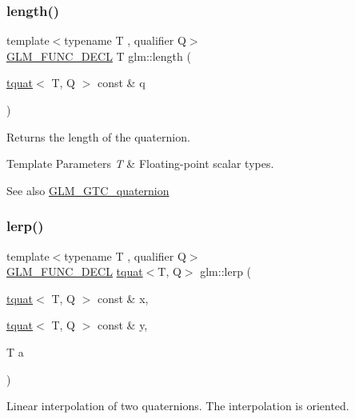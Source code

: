 \subsubsection{\texorpdfstring{length()}{length()}}
{\footnotesize\ttfamily template$<$typename T , qualifier Q$>$ \\
\mbox{\hyperlink{setup_8hpp_ab2d052de21a70539923e9bcbf6e83a51}{G\+L\+M\+\_\+\+F\+U\+N\+C\+\_\+\+D\+E\+CL}} T glm\+::length (\begin{DoxyParamCaption}\item[{\mbox{\hyperlink{structglm_1_1tquat}{tquat}}$<$ T, Q $>$ const \&}]{q }\end{DoxyParamCaption})}

Returns the length of the quaternion.


\begin{DoxyTemplParams}{Template Parameters}
{\em T} & Floating-\/point scalar types.\\
\hline
\end{DoxyTemplParams}
\begin{DoxySeeAlso}{See also}
\mbox{\hyperlink{group__gtc__quaternion}{G\+L\+M\+\_\+\+G\+T\+C\+\_\+quaternion}} 
\end{DoxySeeAlso}
\mbox{\label{group__gtc__quaternion_gabc58e7013ef63d6df69c28c14afd0c01}} 
\subsubsection{\texorpdfstring{lerp()}{lerp()}}
{\footnotesize\ttfamily template$<$typename T , qualifier Q$>$ \\
\mbox{\hyperlink{setup_8hpp_ab2d052de21a70539923e9bcbf6e83a51}{G\+L\+M\+\_\+\+F\+U\+N\+C\+\_\+\+D\+E\+CL}} \mbox{\hyperlink{structglm_1_1tquat}{tquat}}$<$T, Q$>$ glm\+::lerp (\begin{DoxyParamCaption}\item[{\mbox{\hyperlink{structglm_1_1tquat}{tquat}}$<$ T, Q $>$ const \&}]{x,  }\item[{\mbox{\hyperlink{structglm_1_1tquat}{tquat}}$<$ T, Q $>$ const \&}]{y,  }\item[{T}]{a }\end{DoxyParamCaption})}

Linear interpolation of two quaternions. The interpolation is oriented.


